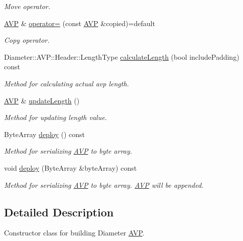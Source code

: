 \begin{DoxyCompactItemize}
\begin{DoxyCompactList}\small\item\em Move operator. \end{DoxyCompactList}\item 
\hyperlink{classDiameter_1_1AVP}{A\+VP} \& \hyperlink{classDiameter_1_1AVP_adfe27eb6cac4704d495f3f21830abb4e}{operator=} (const \hyperlink{classDiameter_1_1AVP}{A\+VP} \&copied)=default
\begin{DoxyCompactList}\small\item\em Copy operator. \end{DoxyCompactList}\item 
Diameter\+::\+A\+V\+P\+::\+Header\+::\+Length\+Type \hyperlink{classDiameter_1_1AVP_a755fe56553f0a9649c60fab98672a384}{calculate\+Length} (bool include\+Padding) const
\begin{DoxyCompactList}\small\item\em Method for calculating actual avp length. \end{DoxyCompactList}\item 
\hyperlink{classDiameter_1_1AVP}{A\+VP} \& \hyperlink{classDiameter_1_1AVP_abb3ae19edc433ec2832e4cf2d72c425d}{update\+Length} ()
\begin{DoxyCompactList}\small\item\em Method for updating length value. \end{DoxyCompactList}\item 
Byte\+Array \hyperlink{classDiameter_1_1AVP_acb802bb9d8980848852b226c26bf4cb1}{deploy} () const
\begin{DoxyCompactList}\small\item\em Method for serializing \hyperlink{classDiameter_1_1AVP}{A\+VP} to byte array. \end{DoxyCompactList}\item 
void \hyperlink{classDiameter_1_1AVP_a9ac8102ba4fdc09a1df4904b4517c3d3}{deploy} (Byte\+Array \&byte\+Array) const
\begin{DoxyCompactList}\small\item\em Method for serializing \hyperlink{classDiameter_1_1AVP}{A\+VP} to byte array. \hyperlink{classDiameter_1_1AVP}{A\+VP} will be appended. \end{DoxyCompactList}\end{DoxyCompactItemize}


\subsection{Detailed Description}
Constructor class for building Diameter \hyperlink{classDiameter_1_1AVP}{A\+VP}. 

